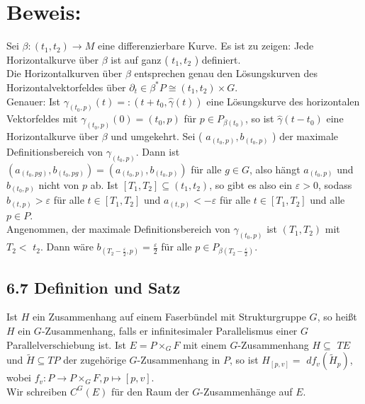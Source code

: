 \documentclass[10pt, letterpaper]{article}
\begin{document}
\section*{Beweis:}
Sei $\beta:\left(t_{1}, t_{2}\right) \rightarrow M$ eine differenzierbare Kurve. Es ist zu zeigen: Jede Horizontalkurve über $\beta$ ist auf ganz ( $t_{1}, t_{2}$ ) definiert.\\
Die Horizontalkurven über $\beta$ entsprechen genau den Lösungskurven des Horizontalvektorfeldes über $\partial_{t} \in \beta^{*} P \cong\left(t_{1}, t_{2}\right) \times G$.\\
Genauer: Ist $\gamma_{\left(t_{0}, p\right)}(t)=:\left(t+t_{0}, \hat{\gamma}(t)\right)$ eine Lösungskurve des horizontalen Vektorfeldes mit $\gamma_{\left(t_{0}, p\right)}(0)=\left(t_{0}, p\right)$ für $p \in P_{\beta\left(t_{0}\right)}$, so ist $\hat{\gamma}\left(t-t_{0}\right)$ eine Horizontalkurve über $\beta$ und umgekehrt. Sei ( $a_{\left(t_{0}, p\right)}, b_{\left(t_{0}, p\right)}$ ) der maximale Definitionsbereich von $\gamma_{\left(t_{0}, p\right)}$. Dann ist $\left(a_{\left(t_{0}, p g\right)}, b_{\left(t_{0}, p g\right)}\right)=\left(a_{\left(t_{0}, p\right)}, b_{\left(t_{0}, p\right)}\right)$ für alle $g \in G$, also hängt $a_{\left(t_{0}, p\right)}$ und $b_{\left(t_{0}, p\right)}$ nicht von $p$ ab. Ist $\left[T_{1}, T_{2}\right] \subseteq\left(t_{1}, t_{2}\right)$, so gibt es also ein $\varepsilon>0$, sodass $b_{(t, p)}>\varepsilon$ für alle $t \in\left[T_{1}, T_{2}\right]$ und $a_{(t, p)}<-\varepsilon$ für alle $t \in\left[T_{1}, T_{2}\right]$ und alle $p \in P$.\\
Angenommen, der maximale Definitionsbereich von $\gamma_{\left(t_{0}, p\right)}$ ist $\left(T_{1}, T_{2}\right)$ mit $T_{2}<$ $t_{2}$. Dann wäre $b_{\left(T_{2}-\frac{\varepsilon}{2}, p\right)}=\frac{\varepsilon}{2}$ für alle $p \in P_{\beta\left(T_{2}-\frac{\varepsilon}{2}\right)}$.

\subsection*{6.7 Definition und Satz}
Ist $H$ ein Zusammenhang auf einem Faserbündel mit Strukturgruppe $G$, so heißt $H$ ein $G$-Zusammenhang, falls er infinitesimaler Parallelismus einer $G$ Parallelverschiebung ist. Ist $E=P \times_{G} F$ mit einem $G$-Zusammenhang $H \subseteq$ $T E$ und $\tilde{H} \subseteq T P$ der zugehörige $G$-Zusammenhang in $P$, so ist $H_{[p, v]}=$ $d f_{v}\left(\tilde{H}_{p}\right)$, wobei $f_{v}: P \rightarrow P \times_{G} F, p \mapsto[p, v]$.\\
Wir schreiben $C^{G}(E)$ für den Raum der $G$-Zusammenhänge auf $E$.
\end{document}
